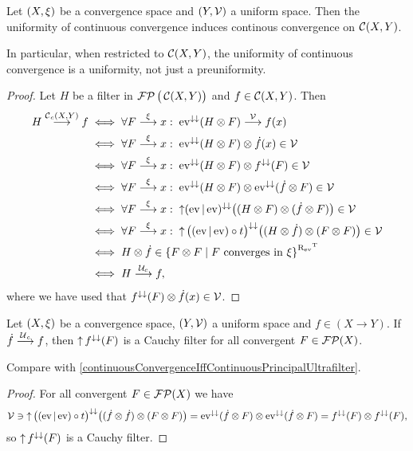 \begin{proposition} \label{continuousConvergenceUniformity}
Let $\sSet{X, \xi}$ be a convergence space and $\sSet{Y, \mathcal{V}}$ a uniform space. Then the uniformity of continuous convergence induces continous convergence on $\operatorname{\mathcal{C}}(X, Y)$.
\end{proposition}
In particular, when restricted to $\operatorname{\mathcal{C}}(X,Y)$, the uniformity of continuous convergence is a uniformity, not just a preuniformity.
\begin{proof}
Let $H$ be a filter in $\operatorname{\mathcal{FP}}\big(\operatorname{\mathcal{C}}(X,Y)\big)$ and $f\in \operatorname{\mathcal{C}}(X, Y)$. Then
\begin{align*}
H\overset{\cont_c(X, Y)}{\longrightarrow} f &\iff \forall F\overset{\xi}{\longrightarrow}x: \; \evalMap^{\imf\imf}(H\otimes F) \overset{\mathcal{V}}{\longrightarrow} f(x) \\
&\iff \forall F\overset{\xi}{\longrightarrow}x: \; \evalMap^{\imf\imf}(H\otimes F)\otimes \pfilter{f}(x) \in\mathcal{V} \\
&\iff \forall F\overset{\xi}{\longrightarrow}x: \; \evalMap^{\imf\imf}(H\otimes F)\otimes f^{\imf\imf}(F) \in\mathcal{V} \\
&\iff \forall F\overset{\xi}{\longrightarrow}x: \; \evalMap^{\imf\imf}(H\otimes F)\otimes \evalMap^{\imf\imf}(\pfilter{f}\otimes F) \in\mathcal{V} \\
&\iff \forall F\overset{\xi}{\longrightarrow}x: \; \upset(\evalMap|\evalMap)^{\imf\imf}\big((H\otimes F)\otimes(\pfilter{f}\otimes F)\big) \in\mathcal{V} \\
&\iff \forall F\overset{\xi}{\longrightarrow}x: \; \upset\big((\evalMap|\evalMap)\circ t\big)^{\imf\imf}\big((H\otimes \pfilter{f})\otimes(F\otimes F)\big) \in\mathcal{V} \\
&\iff H\otimes \pfilter{f}\in \setbuilder{F\otimes F}{\text{$F$ converges in $\xi$}}^{\uRelEv^\transp} \\
&\iff H\overset{\mathcal{U}_c}{\longrightarrow} f,
\end{align*}
where we have used that $f^{\downarrow\downarrow}(F)\otimes \dot{f}(x)\in \mathcal{V}$.
\end{proof}

\begin{lemma}
Let $\sSet{X, \xi}$ be a convergence space, $\sSet{Y, \mathcal{V}}$ a uniform space and $f\in (X\to Y)$. If $\dot{f}\overset{\operatorname{\mathcal{U}}_c}{\longrightarrow} f$, then $\operatorname{\uparrow} f^{\downarrow\downarrow}(F)$ is a Cauchy filter for all convergent $F\in \operatorname{\mathcal{FP}}(X)$.
\end{lemma}
Compare with \ref{continuousConvergenceIffContinuousPrincipalUltrafilter}.
\begin{proof}
For all convergent $F\in\operatorname{\mathcal{FP}}(X)$ we have
\[ \mathcal{V} \ni \operatorname{\uparrow}\big((\operatorname{ev}|\operatorname{ev})\circ t\big)^{\downarrow\downarrow}\big((\dot{f}\otimes \dot{f})\otimes(F\otimes F)\big) = \operatorname{ev}^{\downarrow\downarrow}(\dot{f}\otimes F)\otimes \operatorname{ev}^{\downarrow\downarrow}(\dot{f}\otimes F) = f^{\downarrow\downarrow}(F)\otimes f^{\downarrow\downarrow}(F), \]
so $\operatorname{\uparrow} f^{\downarrow\downarrow}(F)$ is a Cauchy filter.
\end{proof}

